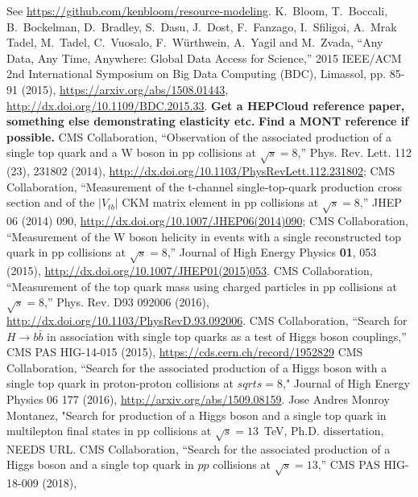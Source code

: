 \begin{thebibliography}{99}
  See
  \url{https://github.com/kenbloom/resource-modeling}.
 K.~Bloom, T.~Boccali, B.~Bockelman, D.~Bradley, S.~Dasu,
  J.~Dost, F.~Fanzago, I.~Sfiligoi, A.~Mrak Tadel, M.~Tadel, C.~Vuosalo,
  F.~W{\"u}rthwein, A.~Yagil and M.~Zvada, ``Any Data, Any Time, Anywhere:
  Global Data Access for Science,'' 2015 IEEE/ACM 2nd International
  Symposium on Big Data Computing (BDC), Limassol, pp. 85-91 (2015),
  \url{https://arxiv.org/abs/1508.01443}, \url{http://dx.doi.org/10.1109/BDC.2015.33}.
 {\bf Get a HEPCloud reference paper, something else
    demonstrating elasticity etc.}
   {\bf Find a MONT reference if possible.}
%
CMS Collaboration, ``Observation of the associated production of a single top quark and a W boson in pp collisions at $\sqrt{s}=$8\TeV,'' Phys. Rev. Lett. 112 (23), 231802 (2014), \url{http://dx.doi.org/10.1103/PhysRevLett.112.231802};
%
CMS Collaboration, ``Measurement of the t-channel single-top-quark production cross section and of the $|V_{tb}|$ CKM matrix element in pp collisions at $\sqrt{s} = 8$\TeV,'' JHEP 06 (2014) 090, \url{http://dx.doi.org/10.1007/JHEP06(2014)090};
%
CMS Collaboration, ``Measurement of the W boson helicity in events with a
single reconstructed top quark in pp collisions at $\sqrt{s}=$8\TeV,''
Journal of High Energy Physics {\bf 01},  053 (2015),
\url{http://dx.doi.org/10.1007/JHEP01(2015)053}.
 CMS Collaboration, ``Measurement of the top quark mass using charged
 particles in pp collisions at $\sqrt{s} = 8$\TeV,'' Phys. Rev.  D93 092006
 (2016), \url{http://dx.doi.org/10.1103/PhysRevD.93.092006}. 
 CMS Collaboration, ``Search for $H \to b\bar{b}$ in
  association with single top quarks as a test of Higgs boson couplings,'' CMS PAS HIG-14-015 (2015), \url{https://cds.cern.ch/record/1952829}
 CMS Collaboration, ``Search for the associated
  production of a Higgs boson with a single top quark in proton-proton
  collisions at $sqrt{s} = 8$\TeV," Journal of High Energy Physics 06 177 (2016), \url{http://arxiv.org/abs/1509.08159}.
   Jose Andres Monroy Montanez, "Search for production of a Higgs boson and a single top quark in multilepton final states in pp collisions at $\sqrt{s} = 13$~TeV, Ph.D. dissertation, NEEDS URL.
   CMS Collaboration, ``Search for the associated
    production of a Higgs boson and a single top quark in $pp$ collisions
    at $\sqrt{s} = 13$\TeV,'' CMS PAS HIG-18-009 (2018),

\end{thebibliography}
